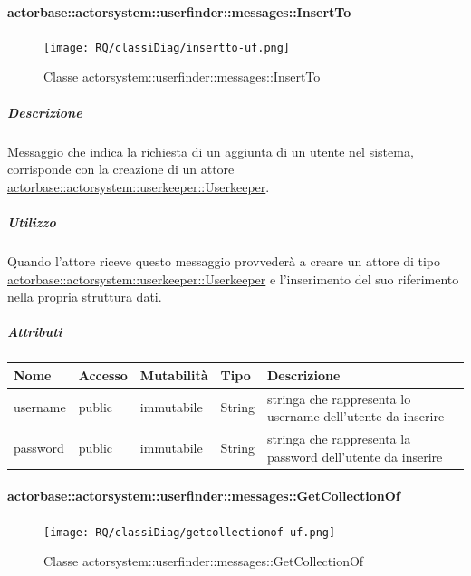 \documentclass{scalatekids-article}
\begin{document}
\paragraph{actorbase::actorsystem::userfinder::messages::InsertTo}
\label{sec:actorbase::actorsystem::userfinder::messages::InsertTo}

\begin{figure}[H]
  \begin{center}
    \texttt{[image: RQ/classiDiag/insertto-uf.png]}
    \caption{Classe actorsystem::userfinder::messages::InsertTo}
  \end{center}
\end{figure}

\subparagraph{Descrizione}
Messaggio che indica la richiesta di un aggiunta di un utente nel sistema,
corrisponde con la creazione di un attore \hyperref[sec:actorbase::actorsystem::userkeeper::Userkeeper]{actorbase::\allowbreak{}actorsystem::\allowbreak{}userkeeper::\allowbreak{}Userkeeper}.

\subparagraph{Utilizzo}
Quando l'attore riceve questo messaggio provvederà a creare un attore di tipo \hyperref[sec:actorbase::actorsystem::userkeeper::Userkeeper]{actorbase::\allowbreak{}actorsystem::\allowbreak{}userkeeper::\allowbreak{}Userkeeper}
e l'inserimento del suo riferimento nella propria struttura dati.

\subparagraph{Attributi}
\begin{tabular}{| p{3cm} | p{1.5cm} | p{2cm} | p{2cm} | p{8.5cm} |}
  \hline
  Nome & Accesso & Mutabilità & Tipo & Descrizione\\
  \hline
  username & public & immutabile & String & stringa che rappresenta lo username dell'utente da inserire \\
  \hline
  password & public & immutabile & String & stringa che rappresenta la password dell'utente da inserire \\
  \hline
\end{tabular}

\paragraph{actorbase::actorsystem::userfinder::messages::GetCollectionOf}
\label{sec:actorbase::actorsystem::userfinder::messages::GetCollectionOf}

\begin{figure}[H]
  \begin{center}
    \texttt{[image: RQ/classiDiag/getcollectionof-uf.png]}
    \caption{Classe actorsystem::userfinder::messages::GetCollectionOf}
  \end{center}
\end{figure}
\end{document}
